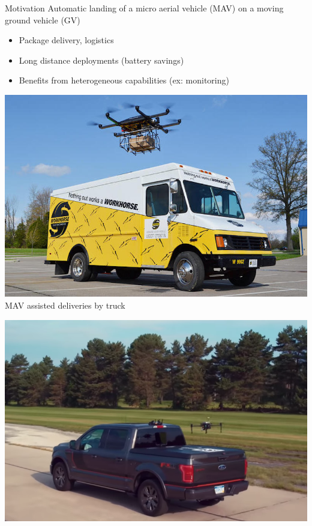 
\begin{frame}{Motivation}
	Automatic landing of a micro aerial vehicle (MAV) on a moving ground vehicle (GV)
	\begin{itemize}
		\item Package delivery, logistics
		\item Long distance deployments (battery savings)
		\item Benefits from heterogeneous capabilities (ex: monitoring) %
	\end{itemize}
        \begin{minipage}[b]{0.45\linewidth}
            \centering
            \includegraphics[width=\textwidth]{figures/ups.jpg}\\
            MAV assisted deliveries by truck
        \end{minipage}
        \hspace{0.5cm}
        \begin{minipage}[b]{0.45\linewidth}
            \centering
            \includegraphics[width=\textwidth]{figures/dji.png}\\

\end{minipage}
\end{frame}
